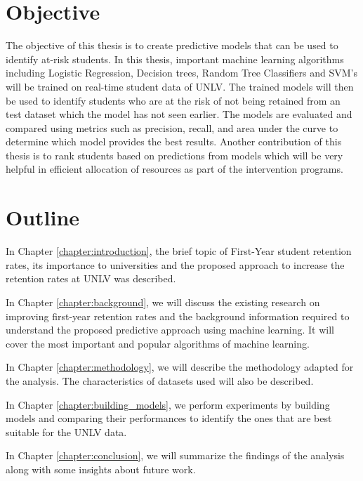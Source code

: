 \documentclass[11pt,openright]{report}
\begin{document}
\section{Objective}\label{section:objective}
The objective of this thesis is to create predictive models that can be used to identify at-risk students. In this thesis, important machine learning algorithms including Logistic Regression, Decision trees, Random Tree Classifiers and SVM's will be trained on real-time student data of UNLV. The trained models will then be used to identify students who are at the risk of not being retained from an test dataset which the model has not seen earlier. The models are evaluated and compared using metrics such as precision, recall, and area under the curve to determine which model provides the best results. Another contribution of this thesis is to rank students based on predictions from models which will be very helpful in efficient allocation of resources as part of the intervention programs.

\section{Outline}\label{section:outline}

In Chapter \ref{chapter:introduction}, the brief topic of First-Year student retention rates, its importance to universities and the proposed approach to increase the retention rates at UNLV was described.\newline

\noindent In Chapter \ref{chapter:background}, we will discuss the existing research on improving first-year retention rates and the background information required to understand the proposed predictive approach using machine learning. It will cover the most important and popular algorithms of machine learning.
\newline

\noindent In Chapter \ref{chapter:methodology}, we will describe the methodology adapted for the analysis. The characteristics of datasets used will also be described.
\newline

\noindent In Chapter \ref{chapter:building_models}, we perform experiments by building models and comparing their performances to identify the ones that are best suitable for the UNLV data. \newline

\noindent In Chapter \ref{chapter:conclusion}, we will summarize the findings of the analysis along with some insights about future work.
\end{document}
